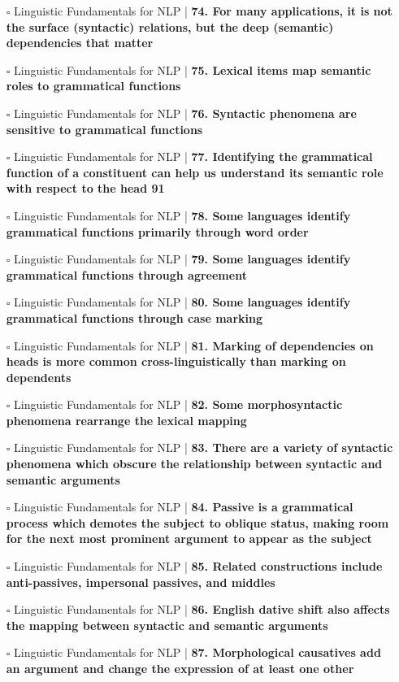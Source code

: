 \documentclass[a4, landscape, 12pt]{article}
\newcommand{\checkbox}{$\square$}%
\begin{document}
\begin{itemize}
{}
\item [\checkbox]  Linguistic Fundamentals for NLP | \textbf{ 74. For many applications, it is not the surface (syntactic) relations, but the deep (semantic) dependencies that matter
}
\item [\checkbox]  Linguistic Fundamentals for NLP | \textbf{ 75. Lexical items map semantic roles to grammatical functions
}
\item [\checkbox]  Linguistic Fundamentals for NLP | \textbf{ 76. Syntactic phenomena are sensitive to grammatical functions
}
\item [\checkbox]  Linguistic Fundamentals for NLP | \textbf{ 77. Identifying the grammatical function of a constituent can help us understand its semantic role with respect to the head 91
}
\item [\checkbox]  Linguistic Fundamentals for NLP | \textbf{ 78. Some languages identify grammatical functions primarily through word order
}
\item [\checkbox]  Linguistic Fundamentals for NLP | \textbf{ 79. Some languages identify grammatical functions through agreement
}
\item [\checkbox]  Linguistic Fundamentals for NLP | \textbf{ 80. Some languages identify grammatical functions through case marking
}
\item [\checkbox]  Linguistic Fundamentals for NLP | \textbf{ 81. Marking of dependencies on heads is more common cross-linguistically than marking on dependents
}
\item [\checkbox]  Linguistic Fundamentals for NLP | \textbf{ 82. Some morphosyntactic phenomena rearrange the lexical mapping
}
\item [\checkbox]  Linguistic Fundamentals for NLP | \textbf{ 83. There are a variety of syntactic phenomena which obscure the relationship between syntactic and semantic arguments
}
\item [\checkbox]  Linguistic Fundamentals for NLP | \textbf{ 84. Passive is a grammatical process which demotes the subject to oblique status, making room for the next most prominent argument to appear as the subject
}
\item [\checkbox]  Linguistic Fundamentals for NLP | \textbf{ 85. Related constructions include anti-passives, impersonal passives, and middles
}
\item [\checkbox]  Linguistic Fundamentals for NLP | \textbf{ 86. English dative shift also affects the mapping between syntactic and semantic arguments
}
\item [\checkbox]  Linguistic Fundamentals for NLP | \textbf{ 87. Morphological causatives add an argument and change the expression of at least one other
}
\end{itemize}
\end{document}
